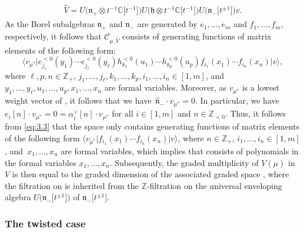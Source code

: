 \documentclass[pdftex]{sigma}
\numberwithin{equation}{section}
\DeclareMathOperator{\gr}{gr}
\begin{document}
\begin{gather*}
\widehat{V}=U\bigl(\mathfrak{n}_+\otimes t^{-1}\mathbb{C}\bigl[t^{-1}\bigr]\bigr)U\bigl(\mathfrak{h}\otimes t^{-1}\mathbb{C}\bigl[t^{-1}\bigr]\bigr)U\bigl(\mathfrak{n}_-\bigl[t^{\pm1}\bigr]\bigr)v.
\end{gather*}
As the Borel subalgebras $\mathfrak{n}_+$ and $\mathfrak{n}_-$ are generated by $e_1,\dots,e_m$ and $f_1,\dots,f_m$, respectively, it follows that $\mathcal{C}_{ \mu,\widehat{V}}$ consists of generating functions of matrix elements of the following form:
\begin{equation}
\big\langle v_{\mu^*}\big|e_{j_1}^{<0}(y_1)\cdots e_{j_{\ell}}^{<0}(y_{\ell})h_{k_1}^{<0}(u_1)\cdots h_{k_p}^{<0}(u_p)f_{i_1}(x_1)\cdots f_{i_n}(x_n)\big|v\big\rangle,\label{eq:3.3}
\end{equation}
where $\ell,p,n\in\mathbb{Z}_+$, $j_1,\dots,j_{\ell},k_1, \dots,k_p,i_1,\dots,i_n\in[1,m]$, and $y_1,\dots,y_{\ell}, u_1,\dots,u_p,x_1,\dots,x_n$ are formal variables. Moreover, as $v_{\mu^*}$ is a lowest weight vector of , it follows that we have~${\widehat{\mathfrak{n}}_-\cdot v_{\mu^*}=0}$. In particular, we have $e_i[n]\cdot v_{\mu^*}=0=\alpha_i^{\vee}[n]\cdot v_{\mu^*}$ for all $i\in[1,m]$ and $n\in\mathbb{Z}_{<0}$. Thus, it follows from \eqref{eq:3.3} that the space  only contains generating functions of matrix elements of the following form
$
\langle v_{\mu^*}\big|f_{i_1}(x_1)\cdots f_{i_n}(x_n)\big|v\rangle$,
where $n\in\mathbb{Z}_+$, $i_1,\dots,i_n\in[1,m]$, and~${x_1, \dots,x_n}$ are formal variables, which implies that  consists of polynomials in the formal variables $x_1, \dots,x_n$. Subsequently, the graded multiplicity of $V({\mu})$ in $V$ is then equal to the graded dimension of the associated graded space \smash{$\gr\mathcal{C}_{\mu,\widehat{V}}$}, where the filtration on  is inherited from the $\mathbb{Z}$-filtration on the universal enveloping algebra $U\bigl(\mathfrak{n}_-\bigl[t^{\pm1}\bigr]\bigr)$ of $\mathfrak{n}_-\bigl[t^{\pm1}\bigr]$.

\subsubsection{The twisted case}\label{Section 3.1.2}
\end{document}
